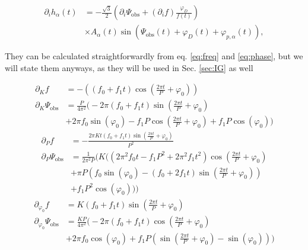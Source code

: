 \documentclass{aa}
\begin{document}
\begin{equation}
\begin{split}
    \partial_i h_\alpha (t) &= -\frac{\sqrt{3}}{2} \left( \partial_i \Psi_\mathrm{obs} + \left(\partial_i f\right) \frac{\varphi_D}{f(t)} \right) \\
    &\times A_\alpha(t)\sin \left(\Psi_\mathrm{obs}(t)+ \varphi_D(t) + \varphi_{p,\alpha}(t)\right),
\end{split}
\end{equation}

They can be calculated straightforwardly from eq. \ref{eq:freq} and \ref{eq:phase}, but we will state them anyways, as they will be used in Sec. \ref{sec:IG} as well

\begin{equation} \label{eq:derivsstart}
\begin{split}
    \partial_K f &= -\left((f_0+f_1 t) \cos \left(\frac{2 \pi  t}{P}+ \varphi_0 \right)\right)\\
    \partial_K \Psi_\mathrm{obs} &= \frac{P}{4\pi^2} \Bigg(-2 \pi  (f_0+f_1 t) \sin \left(\frac{2 \pi  t}{P}+\varphi_0\right) \\ &+2 \pi  f_0 \sin
   (\varphi_0)-f_1 P \cos \left(\frac{2 \pi  t}{P}+\varphi_0\right)+f_1 P \cos (\varphi_0) \Bigg)
\end{split}
\end{equation}
\begin{equation}
\begin{split}
    \partial_P f &= -\frac{2 \pi  K t (f_0+f_1 t) \sin \left(\frac{2 \pi  t}{P}+\varphi_0\right)}{P^2} \\
    \partial_P \Psi_\mathrm{obs} &= \frac{1}{2 \pi ^2 P} \Bigg( K \bigg(\left(2 \pi ^2 f_0 t-f_1 P^2+2 \pi ^2 f_1 t^2\right) \cos \left(\frac{2 \pi
   t}{P}+\varphi_0\right) \\ &+\pi  P \left(f_0 \sin (\varphi_0)-(f_0+2 f_1 t) \sin \left(\frac{2 \pi 
   t}{P}+\varphi_0\right)\right) \\&+f_1 P^2 \cos (\varphi_0)\bigg) \Bigg)
\end{split}
\end{equation}
\begin{equation}
\begin{split}
    \partial_{\varphi_0} f &= K (f_0+f_1 t) \sin \left(\frac{2 \pi  t}{P}+\varphi_0\right) \\
    \partial_{\varphi_0} \Psi_\mathrm{obs} &= \frac{K P}{4 \pi
   ^2}\Bigg( -2 \pi  (f_0+f_1 t) \cos \left(\frac{2 \pi  t}{P}+\varphi_0\right) \\ &+2 \pi  f_0 \cos
   (\varphi_0)+f_1 P \left(\sin \left(\frac{2 \pi  t}{P}+\varphi_0\right)-\sin (\varphi_0)\right) \Bigg)
\end{split}
\end{equation}
\end{document}
